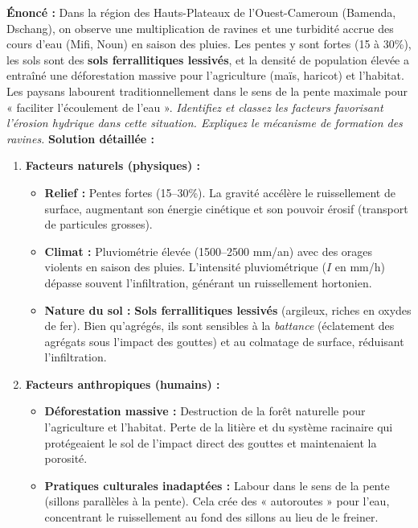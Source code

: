 \documentclass[11pt]{article}
\begin{document}
\begin{exoresolu}
    \textbf{Énoncé :} Dans la région des Hauts-Plateaux de l'Ouest-Cameroun (Bamenda, Dschang), on observe une multiplication de ravines et une turbidité accrue des cours d'eau (Mifi, Noun) en saison des pluies. Les pentes y sont fortes (15 à 30\%), les sols sont des \textbf{sols ferrallitiques lessivés}, et la densité de population élevée a entraîné une déforestation massive pour l'agriculture (maïs, haricot) et l'habitat. Les paysans labourent traditionnellement dans le sens de la pente maximale pour « faciliter l'écoulement de l'eau ».
    \textit{Identifiez et classez les facteurs favorisant l'érosion hydrique dans cette situation. Expliquez le mécanisme de formation des ravines.}
    \tcblower
    \textbf{Solution détaillée :}
    \begin{enumerate}
        \item \textbf{Facteurs naturels (physiques) :}
        \begin{itemize}
            \item \textbf{Relief :} Pentes fortes (15–30\%). La gravité accélère le ruissellement de surface, augmentant son énergie cinétique et son pouvoir érosif (transport de particules grosses).
            \item \textbf{Climat :} Pluviométrie élevée (1500–2500 mm/an) avec des orages violents en saison des pluies. L'intensité pluviométrique ($I$ en mm/h) dépasse souvent l'infiltration, générant un ruissellement hortonien.
            \item \textbf{Nature du sol :} \textbf{Sols ferrallitiques lessivés} (argileux, riches en oxydes de fer). Bien qu'agrégés, ils sont sensibles à la \emph{battance} (éclatement des agrégats sous l'impact des gouttes) et au colmatage de surface, réduisant l'infiltration.
        \end{itemize}
        \item \textbf{Facteurs anthropiques (humains) :}
        \begin{itemize}
            \item \textbf{Déforestation massive :} Destruction de la forêt naturelle pour l'agriculture et l'habitat. Perte de la litière et du système racinaire qui protégeaient le sol de l'impact direct des gouttes et maintenaient la porosité.
            \item \textbf{Pratiques culturales inadaptées :} Labour dans le sens de la pente (sillons parallèles à la pente). Cela crée des « autoroutes » pour l'eau, concentrant le ruissellement au fond des sillons au lieu de le freiner.

\end{itemize}
\end{enumerate}
\end{exoresolu}
\end{document}
